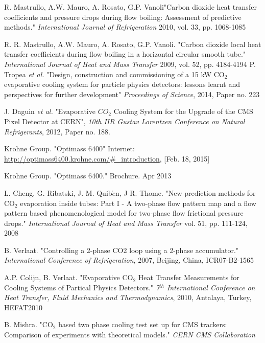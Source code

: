 \documentclass{report}
\begin{document}
\begin{thebibliography}{9}
R. Mastrullo, A.W. Mauro, A. Rosato, G.P. Vanoli"Carbon dioxide heat transfer coefficients and pressure drops during flow boiling: Assessment of predictive methods." \textit{International Journal of Refrigeration} 2010, vol. 33, pp. 1068-1085

R. R. Mastrullo, A.W. Mauro, A. Rosato, G.P. Vanoli. "Carbon dioxide local heat transfer coefficients during flow boiling in a horizontal circular smooth tube." \textit{International Journal of Heat and Mass Transfer} 2009, vol. 52, pp. 4184-4194
P. Tropea \textit{et al.} "Design, construction and commissioning of a 15 kW CO$_2$ evaporative cooling system for particle physics detectors: lessons learnt and perspectives for further development" \textit{Proceedings of Science}, 2014, Paper no. 223

J. Daguin \textit{et al.} "Evaporative $CO_2$ Cooling System for the Upgrade of the CMS Pixel Detector at CERN", \textit{10th IIR Gustav Lorentzen Conference on Natural Refrigerants}, 2012, Paper no. 188.

Krohne Group. "Optimass 6400" Internet: \underline{http://optimass6400.krohne.com/\#\_introduction}, [Feb. 18, 2015]

Krohne Group. "Optimass 6400." Brochure. Apr 2013

L. Cheng, G. Ribatski, J. M. Quib$\acute{e}$n, J R. Thome. "New prediction methods for CO$_2$ evaporation inside tubes: Part I - A two-phase flow pattern map and a flow pattern based phenomenological model for two-phase flow frictional pressure drops." \textit{International Journal of Heat and Mass Transfer} vol. 51, pp. 111-124, 2008



B. Verlaat. "Controlling a 2-phase CO2 loop using a 2-phase accumulator." \textit{International Conference of Refrigeration}, 2007, Beijing, China, ICR07-B2-1565 

A.P. Colijn, B. Verlaat. "Evaporative CO$_2$ Heat Transfer Measurements for Cooling Systems of Partical Physics Detectors." \textit{7$^{
th}$ International Conference on Heat Transfer, Fluid Mechanics and Thermodynamics}, 2010, Antalaya, Turkey, HEFAT2010 

B. Mishra. "CO$_2$ based two phase cooling test set up for CMS trackers: Comparison of experiments with theoretical models." \textit{CERN CMS Collaboration}


\end{thebibliography}
\end{document}
